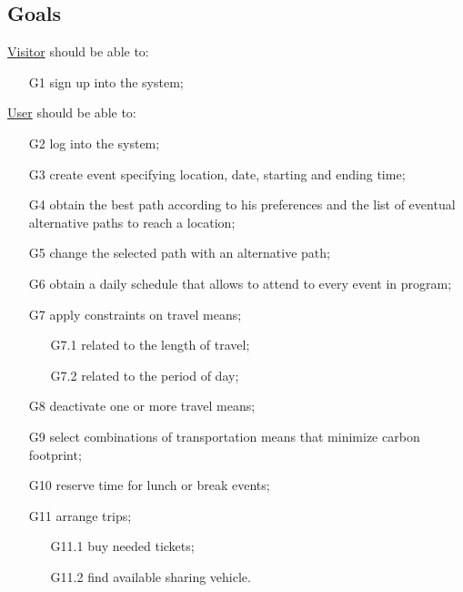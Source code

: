 \subsection{Goals}

\underline{Visitor} should be able to:
\begin{itemize}
\item [G1] sign up into the system;
\end{itemize}

\noindent\underline{User} should be able to:
\begin{itemize}
\item[G2] log into the system;
\item[G3] create event specifying location, date, starting and ending time;
\item[G4] obtain the best path according to his preferences and the list of eventual alternative paths to reach a location;
\item[G5] change the selected path with an alternative path; 
\item[G6] obtain a daily schedule that allows to attend to every event in program;
\item[G7] apply constraints on travel means;
	\begin{itemize}
	\item[G7.1] related to the length of travel;
	\item[G7.2] related to the period of day;
	\end{itemize}
\item[G8] deactivate one or more travel means;
\item[G9] select combinations of transportation means that minimize carbon footprint;
\item[G10] reserve time for lunch or break events;
\item[G11] arrange trips;
	\begin{itemize}
	\item[G11.1] buy needed tickets;
	\item[G11.2] find available sharing vehicle.
	\end{itemize}
\end{itemize}
